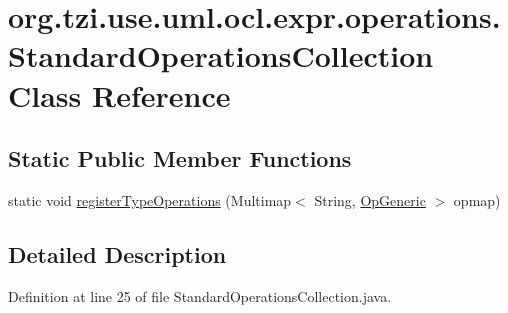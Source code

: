 \hypertarget{classorg_1_1tzi_1_1use_1_1uml_1_1ocl_1_1expr_1_1operations_1_1_standard_operations_collection}{\section{org.\-tzi.\-use.\-uml.\-ocl.\-expr.\-operations.\-Standard\-Operations\-Collection Class Reference}
\label{classorg_1_1tzi_1_1use_1_1uml_1_1ocl_1_1expr_1_1operations_1_1_standard_operations_collection}
}
\subsection*{Static Public Member Functions}
\begin{DoxyCompactItemize}
\item 
static void \hyperlink{classorg_1_1tzi_1_1use_1_1uml_1_1ocl_1_1expr_1_1operations_1_1_standard_operations_collection_a0a096c66fbbda92b0eacf427eb533413}{register\-Type\-Operations} (Multimap$<$ String, \hyperlink{classorg_1_1tzi_1_1use_1_1uml_1_1ocl_1_1expr_1_1operations_1_1_op_generic}{Op\-Generic} $>$ opmap)
\end{DoxyCompactItemize}


\subsection{Detailed Description}


Definition at line 25 of file Standard\-Operations\-Collection.\-java.



